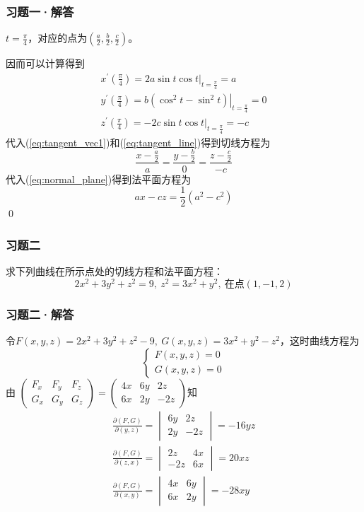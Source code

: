 \begin{frame}
    \frametitle{习题一·解答}

    $t=\frac{\pi}{4}$，对应的点为$\left(\frac{a}{2},\frac{b}{2},\frac{c}{2}\right)$。\pause
    
    因而可以计算得到\pause
    \begin{gather*}
        x^\prime\left(\frac{\pi}{4}\right)=\left.2a\sin t\cos t\right|_{t=\frac{\pi}{4}}=a\\
        y^\prime\left(\frac{\pi}{4}\right)=\left.b\left(\cos^2t-\sin^2t\right)\right|_{t=\frac{\pi}{4}}=0\\
        z^\prime\left(\frac{\pi}{4}\right)=\left.-2c\sin t\cos t\right|_{t=\frac{\pi}{4}}=-c
    \end{gather*}\pause
    代入(\ref{eq:tangent_vec1})和(\ref{eq:tangent_line})得到切线方程为
    $$\frac{x-\frac{a}{2}}{a}=\frac{y-\frac{b}{2}}{0}=\frac{z-\frac{c}{2}}{-c}$$\pause
    代入(\ref{eq:normal_plane})得到法平面方程为
    $$ax-cz=\frac{1}{2}(a^2-c^2)$$
    \qed

\end{frame}

\begin{frame}
    \frametitle{习题二}

    求下列曲线在所示点处的切线方程和法平面方程：
    $$
        2x^2+3y^2+z^2=9,\ z^2=3x^2+y^2,\ \text{在点}(1,-1,2)
    $$

\end{frame}

\begin{frame}
    \frametitle{习题二·解答}

    令$F(x,y,z)=2x^2+3y^2+z^2-9,\ G(x,y,z)=3x^2+y^2-z^2$，这时曲线方程为
    $$\begin{cases}
        F(x,y,z)=0\\
        G(x,y,z)=0
    \end{cases}$$\pause
    由%
    $\left(\begin{smallmatrix}
        F_x & F_y & F_z\\
        G_x & G_y & G_z
    \end{smallmatrix}\right)=\left(\begin{smallmatrix}
        4x & 6y & 2z\\
        6x & 2y & -2z
    \end{smallmatrix}\right)$知\pause
    \begin{gather*}
        \frac{\partial(F,G)}{\partial(y,z)}=\begin{vmatrix}6y&2z\\2y&-2z\end{vmatrix}=-16yz\\
        \frac{\partial(F,G)}{\partial(z,x)}=\begin{vmatrix}2z&4x\\-2z&6x\end{vmatrix}=20xz\\
        \frac{\partial(F,G)}{\partial(x,y)}=\begin{vmatrix}4x&6y\\6x&2y\end{vmatrix}=-28xy
    \end{gather*}

\end{frame}

